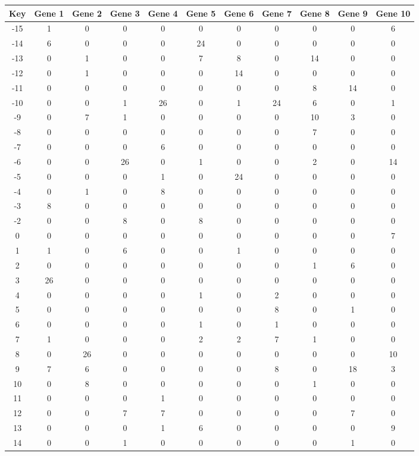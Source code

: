 \begin{tabular}{|c|c|c|c|c|c|c|c|c|c|c|}
\hline
Key & Gene 1 & Gene 2 & Gene 3 & Gene 4 & Gene 5 & Gene 6 & Gene 7 & Gene 8 & Gene 9 & Gene 10 \\
\hline
-15 & 1 & 0 & 0 & 0 & 0 & 0 & 0 & 0 & 0 & 6 \\
-14 & 6 & 0 & 0 & 0 & 24 & 0 & 0 & 0 & 0 & 0 \\
-13 & 0 & 1 & 0 & 0 & 7 & 8 & 0 & 14 & 0 & 0 \\
-12 & 0 & 1 & 0 & 0 & 0 & 14 & 0 & 0 & 0 & 0 \\
-11 & 0 & 0 & 0 & 0 & 0 & 0 & 0 & 8 & 14 & 0 \\
-10 & 0 & 0 & 1 & 26 & 0 & 1 & 24 & 6 & 0 & 1 \\
-9 & 0 & 7 & 1 & 0 & 0 & 0 & 0 & 10 & 3 & 0 \\
-8 & 0 & 0 & 0 & 0 & 0 & 0 & 0 & 7 & 0 & 0 \\
-7 & 0 & 0 & 0 & 6 & 0 & 0 & 0 & 0 & 0 & 0 \\
-6 & 0 & 0 & 26 & 0 & 1 & 0 & 0 & 2 & 0 & 14 \\
-5 & 0 & 0 & 0 & 1 & 0 & 24 & 0 & 0 & 0 & 0 \\
-4 & 0 & 1 & 0 & 8 & 0 & 0 & 0 & 0 & 0 & 0 \\
-3 & 8 & 0 & 0 & 0 & 0 & 0 & 0 & 0 & 0 & 0 \\
-2 & 0 & 0 & 8 & 0 & 8 & 0 & 0 & 0 & 0 & 0 \\
0 & 0 & 0 & 0 & 0 & 0 & 0 & 0 & 0 & 0 & 7 \\
1 & 1 & 0 & 6 & 0 & 0 & 1 & 0 & 0 & 0 & 0 \\
2 & 0 & 0 & 0 & 0 & 0 & 0 & 0 & 1 & 6 & 0 \\
3 & 26 & 0 & 0 & 0 & 0 & 0 & 0 & 0 & 0 & 0 \\
4 & 0 & 0 & 0 & 0 & 1 & 0 & 2 & 0 & 0 & 0 \\
5 & 0 & 0 & 0 & 0 & 0 & 0 & 8 & 0 & 1 & 0 \\
6 & 0 & 0 & 0 & 0 & 1 & 0 & 1 & 0 & 0 & 0 \\
7 & 1 & 0 & 0 & 0 & 2 & 2 & 7 & 1 & 0 & 0 \\
8 & 0 & 26 & 0 & 0 & 0 & 0 & 0 & 0 & 0 & 10 \\
9 & 7 & 6 & 0 & 0 & 0 & 0 & 8 & 0 & 18 & 3 \\
10 & 0 & 8 & 0 & 0 & 0 & 0 & 0 & 1 & 0 & 0 \\
11 & 0 & 0 & 0 & 1 & 0 & 0 & 0 & 0 & 0 & 0 \\
12 & 0 & 0 & 7 & 7 & 0 & 0 & 0 & 0 & 7 & 0 \\
13 & 0 & 0 & 0 & 1 & 6 & 0 & 0 & 0 & 0 & 9 \\
14 & 0 & 0 & 1 & 0 & 0 & 0 & 0 & 0 & 1 & 0 \\
\hline
\end{tabular}